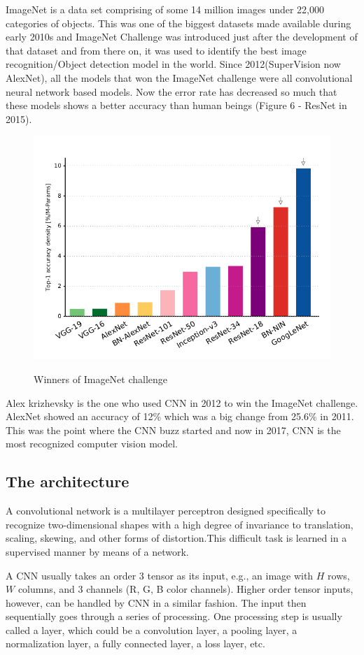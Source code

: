 \documentclass[12pt]{article}
\begin{document}
ImageNet is a data set comprising of some 14 million images under 22,000 categories of objects. This was one of the biggest datasets made available during early 2010s and ImageNet Challenge was introduced just after the development of that dataset and from there on, it was used to identify the best image recognition/Object detection model in the world. Since 2012(SuperVision now AlexNet), all the models that won the ImageNet challenge were all convolutional neural network based models. Now the error rate has decreased so much that these models shows a better accuracy than human beings (Figure 6 - ResNet in 2015). 
\begin{figure}[h]
    	\centering
    	\includegraphics[width=0.75 \textwidth]{f.png}
       	\label{fig:mesh7}
	\caption{Winners of ImageNet challenge}
	\end{figure} 
    
    Alex krizhevsky is the one who used CNN in 2012 to win the ImageNet challenge. AlexNet showed an accuracy of 12\% which was a big change from 25.6\% in 2011. This was the point where the CNN buzz started and now in 2017, CNN is the most recognized computer vision model. 
    
    \subsection{The architecture}
    
    A convolutional network is a multilayer perceptron designed specifically to recognize two-dimensional shapes with a high degree of invariance to translation, scaling, skewing, and other forms of distortion.This difficult task is learned in a supervised manner by means of a network.
    
    A CNN usually takes an order 3 tensor as its input, e.g., an image with $H$ rows, $W$ columns, and 3 channels (R, G, B color channels). Higher order tensor inputs, however, can be handled by CNN in a similar fashion. The input then sequentially goes through a series of processing. One processing step is usually called a layer, which could be a convolution layer, a pooling layer, a normalization layer, a fully connected layer, a loss layer, etc.
    
\end{document}
